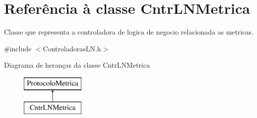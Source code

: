 \hypertarget{class_cntr_l_n_metrica}{
\section{\-Referência à classe \-Cntr\-L\-N\-Metrica}
\label{class_cntr_l_n_metrica}
}


\-Classe que representa a controladora de logica de negocio relacionada as metricas.  




{\ttfamily \#include $<$\-Controladoras\-L\-N.\-h$>$}

\-Diagrama de heranças da classe \-Cntr\-L\-N\-Metrica\begin{figure}[H]
\begin{center}
\leavevmode
\includegraphics[height=2.000000cm]{class_cntr_l_n_metrica}
\end{center}
\end{figure}

